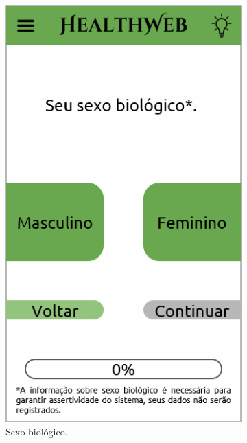 \begin{figure}[htbp]
	\centering
	\begin{subfigure}{0.24\linewidth}
		\centering
		\includegraphics[width=\linewidth]{figure/prototype/mobile/bio_sex.png}
		\caption{Sexo biológico.}
		\label{fig:mobile:bio_sex}
	\end{subfigure}
	\hfill
	\begin{subfigure}{0.24\linewidth}
		\centering

\end{subfigure}
\end{figure}
